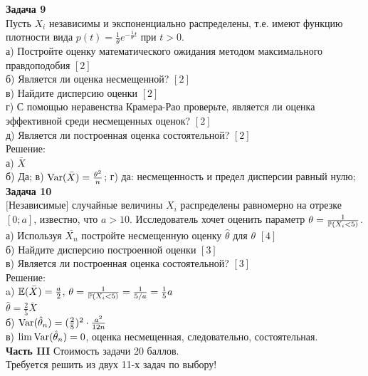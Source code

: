 \documentclass[12pt, a4paper]{article}\usepackage[]{graphicx}\usepackage[]{color}
\begin{document}
	\textbf{Задача 9} \\ %
	Пусть $X_{i}$ независимы и экспоненциально
	распределены, т.е. имеют функцию плотности вида
	$p(t)=\frac{1}{\theta}e^{-\frac{1}{\theta}t}$ при $t>0$. \\
	а) Постройте оценку математического ожидания методом максимального
	правдоподобия $[2]$\\
	б) Является ли оценка несмещенной? $[2]$\\
	в) Найдите дисперсию оценки $[2]$\\
	г) С помощью неравенства Крамера-Рао проверьте, является ли
	оценка эффективной среди несмещенных оценок? $[2]$\\
	д) Является ли построенная оценка состоятельной? $[2]$\\
	Решение: \\
	а) $\bar{X}$ \\
	б) Да; в) $\Var(\bar{X})=\frac{\theta^{2}}{n}$; г) да:
	несмещенность и предел дисперсии равный нулю; \\

	\textbf{Задача 10} \\ %
	$[$Независимые$]$ случайные величины $X_{i}$ распределены
	равномерно на отрезке $[0;a]$, известно, что $a>10$. Исследователь
	хочет оценить
	параметр $\theta=\frac{1}{\P(X_{i}<5)}$. \\
	а) Используя $\bar{X_{n}}$ постройте несмещенную оценку
	$\hat{\theta}$ для $\theta$ $[4]$\\
	б) Найдите дисперсию построенной оценки $[3]$\\
	в) Является ли построенная оценка состоятельной? $[3]$\\
	Решение: \\
	a) $\E(\bar{X})=\frac{a}{2}$,
	$\theta=\frac{1}{\P(X_{i}<5)}=\frac{1}{5/a}=\frac{1}{5}a$ \\
	$\hat{\theta}=\frac{2}{5}\bar{X}$ \\
	б) $\Var(\hat{\theta}_{n})=(\frac{2}{5})^{2}\cdot\frac{a^{2}}{12n}$ \\
	в) $\lim \Var(\hat{\theta}_{n})=0$, оценка несмещенная,
	следовательно, состоятельная. \\

	\textbf{Часть III} Стоимость задачи 20 баллов. \\

	Требуется решить \textbf{} из двух 11-х задач по
	выбору! \\
\end{document}
